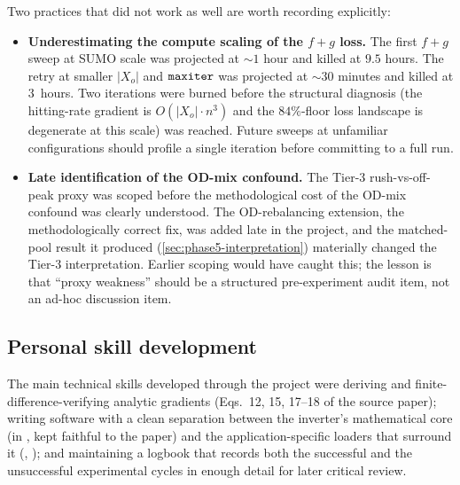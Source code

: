 Two practices that did not work as well are worth recording explicitly:
\begin{itemize}
\item \textbf{Underestimating the compute scaling of the $f+g$ loss.}
The first $f+g$ sweep at SUMO scale was projected at $\sim 1$ hour and
killed at $9.5$ hours. The retry at smaller $|X_o|$ and
$\texttt{maxiter}$ was projected at $\sim 30$ minutes and killed at
$3$~hours. Two iterations were burned before the structural
diagnosis (the hitting-rate gradient is $O(|X_o| \cdot n^3)$ and the
$84\%$-floor loss landscape is degenerate at this scale) was reached.
Future sweeps at unfamiliar configurations should profile a single
iteration before committing to a full run.
\item \textbf{Late identification of the OD-mix confound.} The Tier-3
rush-vs-off-peak proxy was scoped before the methodological cost of
the OD-mix confound was clearly understood. The OD-rebalancing
extension, the methodologically correct fix, was added late in the
project, and the matched-pool result it produced
(\cref{sec:phase5-interpretation}) materially changed the Tier-3 interpretation.
Earlier scoping would have caught this; the lesson is that
``proxy weakness'' should be a structured pre-experiment audit item,
not an ad-hoc discussion item.
\end{itemize}

\subsection{Personal skill development}
\label{sec:reflect-skills}

The main technical skills developed through the project were deriving and
finite-difference-verifying analytic gradients (Eqs.~12, 15, 17--18 of
the source paper); writing software with a clean separation between
the inverter's mathematical core (in , kept faithful
to the paper) and the application-specific loaders that surround it
(, );
and maintaining a logbook that records both the successful and the
unsuccessful experimental cycles in enough detail for later critical
review.

